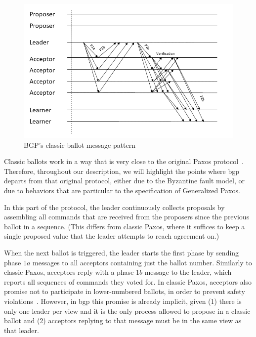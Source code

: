 \begin{figure}
	\centering
	\includegraphics[width=\textwidth*2/3]{Figures/bgp_classic}
	\caption{BGP's classic ballot message pattern}
	\label{bgp_classic}
\end{figure}
Classic ballots work in a way that is very close to the original Paxos protocol~\cite{Lam98}. Therefore, throughout our description, we will highlight the points where \acrshort{bgp} departs from that original protocol, either due to the Byzantine fault model, or due to behaviors that are particular to the specification of Generalized Paxos.

In this part of the protocol, the leader continuously collects proposals by assembling all commands that are received from the proposers since the previous ballot in a sequence. (This differs from classic Paxos, where it suffices to keep a single proposed value that the leader attempts to reach agreement on.)

When the next ballot is triggered, the leader starts the first phase by sending phase $1a$ messages to all acceptors containing just the ballot number. Similarly to classic Paxos, acceptors reply with a phase $1b$ message to the leader, which reports all sequences of commands they voted for. In classic Paxos, acceptors also promise not to participate in lower-numbered ballots, in order to prevent safety violations~\cite{Lam98}. However, in \acrshort{bgp} this promise is already implicit, given (1) there is only one leader per view and it is the only process allowed to propose in a classic ballot and (2) acceptors replying to that message must be in the same view as that leader.


